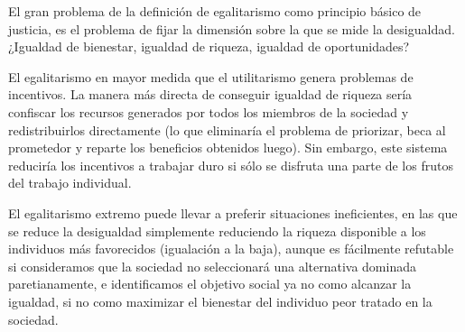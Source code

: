 \documentclass[10pt,a4paper]{article}
\begin{document}
El gran problema de la definición de egalitarismo como principio básico de justicia, es el problema de fijar la dimensión sobre la que se mide la desigualdad. ¿Igualdad de bienestar, igualdad de riqueza, igualdad de oportunidades? 

El egalitarismo en mayor medida que el utilitarismo genera problemas de incentivos. La manera más directa de conseguir igualdad de riqueza sería confiscar los recursos generados por todos los miembros de la sociedad y redistribuirlos directamente (lo que eliminaría el problema de priorizar, beca al prometedor y reparte los beneficios obtenidos luego). Sin embargo, este sistema reduciría los incentivos a trabajar duro si sólo se disfruta una parte de los frutos del trabajo individual. 

El egalitarismo extremo puede llevar a preferir situaciones ineficientes, en las que se reduce la desigualdad simplemente reduciendo la riqueza disponible a los individuos más favorecidos (igualación a la baja), aunque es fácilmente refutable si consideramos que la sociedad no seleccionará una alternativa dominada paretianamente, e identificamos el objetivo social ya no como alcanzar la igualdad, si no como maximizar el bienestar del individuo peor tratado en la sociedad. 
\end{document}
